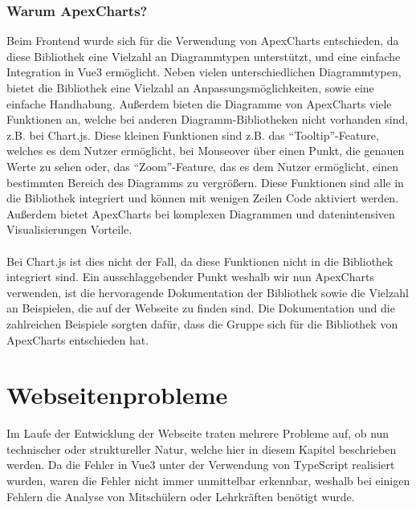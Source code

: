 \subsubsection{Warum ApexCharts?}
Beim Frontend wurde sich für die Verwendung von ApexCharts entschieden,
da diese Bibliothek eine Vielzahl an Diagrammtypen unterstützt,
und eine einfache Integration in Vue3 ermöglicht.
%
Neben vielen unterschiedlichen Diagrammtypen,
bietet die Bibliothek eine Vielzahl an Anpassungsmöglichkeiten,
sowie eine einfache Handhabung.
%
Außerdem bieten die Diagramme von ApexCharts viele Funktionen an, 
welche bei anderen Diagramm-Bibliotheken nicht vorhanden sind, z.B. bei Chart.js.
Diese kleinen Funktionen sind z.B. das ``Tooltip''-Feature,
welches es dem Nutzer ermöglicht, bei Mouseover über einen Punkt, 
die genauen Werte zu sehen oder, das ``Zoom''-Feature, das es dem Nutzer ermöglicht,
einen bestimmten Bereich des Diagramms zu vergrößern.
%
Diese Funktionen sind alle in die Bibliothek integriert und können mit wenigen Zeilen Code aktiviert werden.
Außerdem bietet ApexCharts bei komplexen Diagrammen und datenintensiven Visualisierungen Vorteile.
% 
\\\\
Bei Chart.js ist dies nicht der Fall,
da diese Funktionen nicht in die Bibliothek integriert sind.
%
Ein ausschlaggebender Punkt weshalb wir nun ApexCharts verwenden, 
ist die hervoragende Dokumentation der Bibliothek \cite{ApexCharts} 
sowie die Vielzahl an Beispielen, die auf der Webseite zu finden sind.
%
Die Dokumentation und die zahlreichen Beispiele sorgten dafür, 
dass die Gruppe sich für die Bibliothek von ApexCharts entschieden hat.  

\section{Webseitenprobleme}
\label{subsec:problem_Webseite}
Im Laufe der Entwicklung der Webseite traten mehrere Probleme auf,
ob nun technischer oder struktureller Natur, 
welche hier in diesem Kapitel beschrieben werden.
%
Da die Fehler in Vue3 unter der Verwendung von TypeScript realisiert wurden, 
waren die Fehler nicht immer unmittelbar erkennbar, 
weshalb bei einigen Fehlern die Analyse von Mitschülern oder Lehrkräften benötigt wurde.


